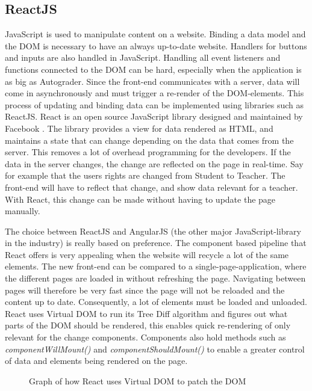 
\subsection{ReactJS}
JavaScript is used to manipulate content on a website. Binding a data model and the DOM is necessary to have an always up-to-date website. Handlers for buttons and inputs are also handled in JavaScript. Handling all event listeners and functions connected to the DOM can be hard, especially when the application is as big as Autograder. Since the front-end communicates with a server, data will come in asynchronously and must trigger a re-render of the DOM-elements. This process of updating and binding data can be implemented using libraries such as ReactJS. React is an open source JavaScript library designed and maintained by Facebook . The library provides a view for data rendered as HTML, and maintains a state that can change depending on the data that comes from the server. This removes a lot of overhead programming for the developers. If the data in the server changes, the change are reflected on the page in real-time. Say for example that the users rights are changed from Student to Teacher. The front-end will have to reflect that change, and show data relevant for a teacher. With React, this change can be made without having to update the page manually. 

The choice between ReactJS and AngularJS (the other major JavaScript-library in the industry) is really based on preference. The component based pipeline that React offers is very appealing when the website will recycle a lot of the same elements. The new front-end can be compared to a single-page-application, where the different pages are loaded in without refreshing the page. Navigating between pages will therefore be very fast since the page will not be reloaded and the content up to date. Consequently, a lot of elements must be loaded and unloaded. React uses Virtual DOM to run its Tree Diff algorithm and figures out what parts of the DOM should be rendered, this enables quick re-rendering of only relevant for the change components. Components also hold methods such as \emph{componentWillMount()} and \emph{componentShouldMount()} to enable a greater control of data and elements being rendered on the page.

\begin{figure}[h]
\centering
\scalebox{0.5}{{}}
\caption{Graph of how React uses Virtual DOM to patch the DOM}
\end{figure}

